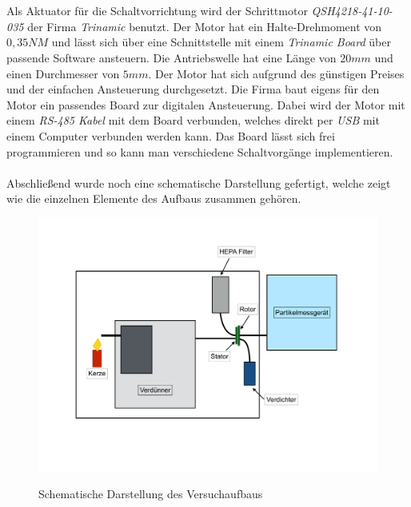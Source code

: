\\\\
Als Aktuator f\"{u}r die Schaltvorrichtung wird der Schrittmotor \textit{QSH4218-41-10-035} der Firma \textit{Trinamic} benutzt. Der Motor hat ein Halte-Drehmoment von \(0,35 NM\) und l\"{a}sst sich \"{u}ber eine Schnittstelle mit einem \textit{Trinamic Board} \"{u}ber passende Software ansteuern. Die Antriebswelle hat eine L\"{a}nge von \(20 mm\) und einen Durchmesser von \(5 mm\). Der Motor hat sich aufgrund des g\"{u}nstigen Preises und der einfachen Ansteuerung durchgesetzt. Die Firma baut eigens f\"{u}r den Motor ein passendes Board zur digitalen Ansteuerung. Dabei wird der Motor mit einem \textit{RS-485 Kabel} mit dem Board verbunden, welches direkt per \textit{USB} mit einem Computer verbunden werden kann. Das Board l\"{a}sst sich frei programmieren und so kann man verschiedene Schaltvorg\"{a}nge implementieren.
\\\\
Abschlie{\ss}end wurde noch eine schematische Darstellung gefertigt, welche zeigt wie die einzelnen Elemente des Aufbaus zusammen geh\"{o}ren.
\begin{figure}[H]
        \myfloatalign
        {\includegraphics[width=.9\linewidth]{gfx/conclusion/aufbau.pdf}} \quad
        \caption[Schematische Darstellung des Versuchaufbaus]
        {Schematische Darstellung des Versuchaufbaus}
        \label{fig:scheme}
\end{figure}

